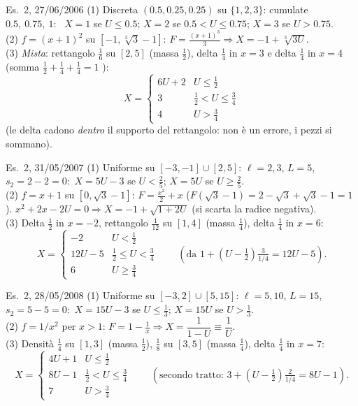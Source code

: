 \begin{esempio}{Es.~2, 27/06/2006}
(1) Discreta $(0.5,0.25,0.25)$ su $\{1,2,3\}$: cumulate $0.5,\ 0.75,\ 1$: \ $X=1$ se $U\le0.5$; $X=2$ se $0.5<U\le0.75$; $X=3$ se $U>0.75$.\\
(2) $f=(x+1)^2$ su $[-1,\sqrt[3]3-1]$: $F=\tfrac{(x+1)^3}{3}\Rightarrow X=-1+\sqrt[3]{3U}$.\\
(3) \emph{Mista}: rettangolo $\tfrac16$ su $[2,5]$ (massa $\tfrac12$), delta $\tfrac14$ in $x=3$ e delta $\tfrac14$ in $x=4$ (somma $\tfrac12+\tfrac14+\tfrac14=1$ \checkmark):
\[
X=\begin{cases}6U+2&U\le\tfrac12\\ 3&\tfrac12<U\le\tfrac34\\ 4&U>\tfrac34\end{cases}
\]
(le delta cadono \emph{dentro} il supporto del rettangolo: non è un errore, i pezzi si sommano).
\end{esempio}

\begin{esempio}{Es.~2, 31/05/2007}
(1) Uniforme su $[-3,-1]\cup[2,5]$: $\ell=2,3$, $L=5$, $s_2=2-2=0$:\ $X=5U-3$ se $U<\tfrac25$; $X=5U$ se $U\ge\tfrac25$.\\
(2) $f=x+1$ su $[0,\sqrt3-1]$: $F=\tfrac{x^2}2+x$ ($F(\sqrt3-1)=2-\sqrt3+\sqrt3-1=1$ \checkmark). $x^2+2x-2U=0\Rightarrow X=-1+\sqrt{1+2U}$ (si scarta la radice negativa).\\
(3) Delta $\tfrac12$ in $x=-2$, rettangolo $\tfrac1{12}$ su $[1,4]$ (massa $\tfrac14$), delta $\tfrac14$ in $x=6$:
\[
X=\begin{cases}-2&U<\tfrac12\\ 12U-5&\tfrac12\le U<\tfrac34\\ 6&U\ge\tfrac34\end{cases}\qquad
(\text{da }1+(U-\tfrac12)\tfrac{3}{1/4}=12U-5).
\]
\end{esempio}

\begin{esempio}{Es.~2, 28/05/2008}
(1) Uniforme su $[-3,2]\cup[5,15]$: $\ell=5,10$, $L=15$, $s_2=5-5=0$:\ $X=15U-3$ se $U\le\tfrac13$; $X=15U$ se $U>\tfrac13$.\\
(2) $f=1/x^2$ per $x>1$: $F=1-\tfrac1x\Rightarrow X=\dfrac1{1-U}\equiv\dfrac1U$.\\
(3) Densità $\tfrac14$ su $[1,3]$ (massa $\tfrac12$), $\tfrac18$ su $[3,5]$ (massa $\tfrac14$), delta $\tfrac14$ in $x=7$:
\[
X=\begin{cases}4U+1&U\le\tfrac12\\ 8U-1&\tfrac12<U\le\tfrac34\\ 7&U>\tfrac34\end{cases}\qquad
(\text{secondo tratto: }3+(U-\tfrac12)\tfrac{2}{1/4}=8U-1).
\]
\end{esempio}

